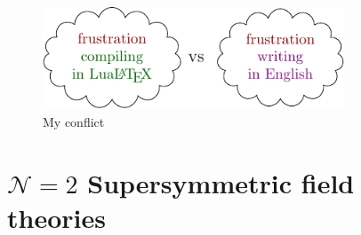 \documentclass[a4paper,pdftex,10pt]{article}
\begin{document}
\begin{figure}[ht]
  \centering
  \includegraphics[width=0.8\textwidth]{fig/picture01.pdf}
  \caption{My conflict}
  \label{fig:myconflict}
\end{figure}


\clearpage
\section{\texorpdfstring{$\mathcal{N}=2$}{N=2} Supersymmetric field theories}













































\clearpage



\end{document}
